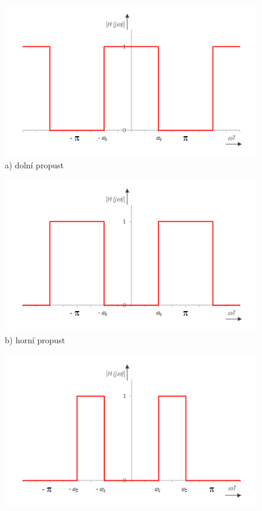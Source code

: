 \documentclass[a4paper, 12pt]{article}
\begin{document}
\begin{figure}[hbt!]
\centering
\begin{minipage}[b]{6.5cm}
  \centering
  \includegraphics[width=\linewidth]{lowpass.png}\\
  a) dolní propust
  \captionsetup{labelformat=empty}
\end{minipage}\hspace{0.5cm}
\begin{minipage}[b]{6.5cm}
  \centering
  \includegraphics[width=\linewidth]{highpass.png}\\
  b) horní propust
  \captionsetup{labelformat=empty}
\end{minipage}\vspace{0.8cm}
\begin{minipage}[b]{6.5cm}
  \centering
  \includegraphics[width=\linewidth]{passband.png}\\

\end{minipage}
\end{figure}
\end{document}
